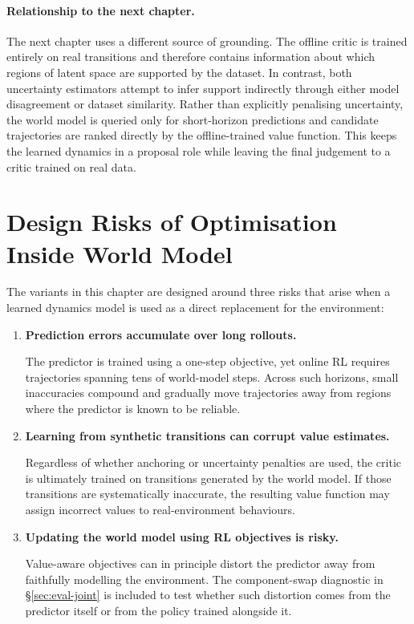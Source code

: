 \paragraph{Relationship to the next chapter.}

The next chapter uses a different source of grounding. The offline
critic is trained entirely on real transitions and therefore contains
information about which regions of latent space are supported by the
dataset. In contrast, both uncertainty estimators attempt to infer
support indirectly through either model disagreement or dataset
similarity.
Rather than
explicitly penalising uncertainty, the world model is queried only for
short-horizon predictions and candidate trajectories are ranked directly
by the offline-trained value function. This keeps the learned dynamics in a
proposal role while leaving the final judgement to a critic trained on real data.


\section{Design Risks of Optimisation Inside World Model}
\label{sec:wmep-synthesis}

The variants in this chapter are designed around three risks that arise when a
learned dynamics model is used as a direct replacement for the environment:

\begin{enumerate}
\item \textbf{Prediction errors accumulate over long rollouts.}

The predictor is trained using a one-step objective, yet online RL
requires trajectories spanning tens of world-model steps.
Across such horizons, small inaccuracies compound and gradually
move trajectories away from regions where the predictor is known to
be reliable.

\item \textbf{Learning from synthetic transitions can corrupt value estimates.}

Regardless of whether anchoring or uncertainty penalties are used,
the critic is ultimately trained on transitions generated by the
world model. If those transitions are systematically inaccurate,
the resulting value function may assign incorrect values to
real-environment behaviours.

\item \textbf{Updating the world model using RL objectives is risky.}

Value-aware objectives can in principle distort the predictor away from faithfully
modelling the environment. The component-swap diagnostic in
\S\ref{sec:eval-joint} is included to test whether such distortion comes from the
predictor itself or from the policy trained alongside it.

\end{enumerate}

